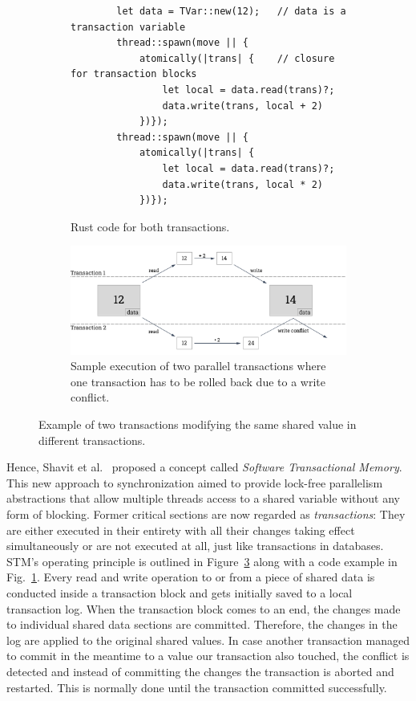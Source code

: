 \begin{figure}[h]
    \begin{subfigure}[h]{\textwidth}
    \begin{verbatim}
        let data = TVar::new(12);   // data is a transaction variable
        thread::spawn(move || {
            atomically(|trans| {    // closure for transaction blocks
                let local = data.read(trans)?;
                data.write(trans, local + 2)
            })});
        thread::spawn(move || {
            atomically(|trans| {
                let local = data.read(trans)?;
                data.write(trans, local * 2)
            })});
    \end{verbatim}
    \caption{Rust code for both transactions.}%
    \label{fig:background:stmcode}
    \end{subfigure}
    \begin{subfigure}[h]{\textwidth}
    \centering
    \includegraphics[width=.9\textwidth,keepaspectratio]{gfx/background-stm}
    \caption{Sample execution of two parallel transactions where one transaction has to be rolled back due to a write conflict.}%
    \label{fig:background:stmflow}
    \end{subfigure}
    \caption{Example of two transactions modifying the same shared value in different transactions.}%
    \label{fig:background:stm}
\end{figure}

Hence, Shavit et al.~\cite{shavit1997software} proposed a concept called \emph{Software Transactional Memory}.
This new approach to synchronization aimed to provide lock-free parallelism abstractions that allow multiple threads access to a shared variable without any form of blocking.
Former critical sections are now regarded as \emph{transactions}: They are either executed in their entirety with all their changes taking effect simultaneously or are not executed at all, just like transactions in databases.
STM's operating principle is outlined in Figure~\ref{fig:background:stm} along with a code example in Fig.~\ref{fig:background:stmcode}.
Every read and write operation to or from a piece of shared data is conducted inside a transaction block and gets initially saved to a local transaction log.
When the transaction block comes to an end, the changes made to individual shared data sections are committed.
Therefore, the changes in the log are applied to the original shared values.
In case another transaction managed to commit in the meantime to a value our transaction also touched, the conflict is detected and instead of committing the changes the transaction is aborted and restarted.
This is normally done until the transaction committed successfully.

